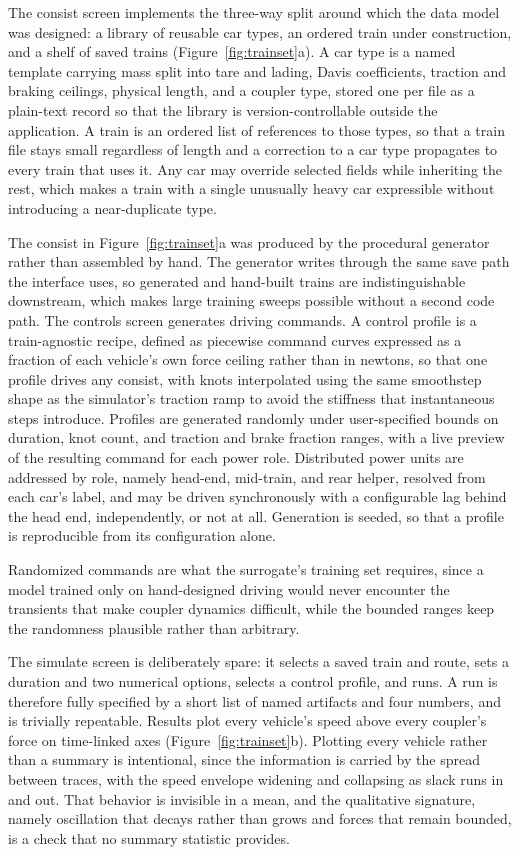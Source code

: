 \documentclass[numbered]{trbunofficial}
\begin{document}
The consist screen implements the three-way split around which the data model was designed: a library of reusable car types, an ordered train under construction, and a shelf of saved trains (Figure~\ref{fig:trainset}a). A car type is a named template carrying mass split into tare and lading, Davis coefficients, traction and braking ceilings, physical length, and a coupler type, stored one per file as a plain-text record so that the library is version-controllable outside the application. A train is an ordered list of references to those types, so that a train file stays small regardless of length and a correction to a car type propagates to every train that uses it. Any car may override selected fields while inheriting the rest, which makes a train with a single unusually heavy car expressible without introducing a near-duplicate type.

The consist in Figure~\ref{fig:trainset}a was produced by the procedural generator rather than assembled by hand. The generator writes through the same save path the interface uses, so generated and hand-built trains are indistinguishable downstream, which makes large training sweeps possible without a second code path. The controls screen generates driving commands. A control profile is a train-agnostic recipe, defined as piecewise command curves expressed as a fraction of each vehicle's own force ceiling rather than in newtons, so that one profile drives any consist, with knots interpolated using the same smoothstep shape as the simulator's traction ramp to avoid the stiffness that instantaneous steps introduce. Profiles are generated randomly under user-specified bounds on duration, knot count, and traction and brake fraction ranges, with a live preview of the resulting command for each power role. Distributed power units are addressed by role, namely head-end, mid-train, and rear helper, resolved from each car's label, and may be driven synchronously with a configurable lag behind the head end, independently, or not at all. Generation is seeded, so that a profile is reproducible from its configuration alone.

Randomized commands are what the surrogate's training set requires, since a model trained only on hand-designed driving would never encounter the transients that make coupler dynamics difficult, while the bounded ranges keep the randomness plausible rather than arbitrary.

The simulate screen is deliberately spare: it selects a saved train and route, sets a duration and two numerical options, selects a control profile, and runs. A run is therefore fully specified by a short list of named artifacts and four numbers, and is trivially repeatable. Results plot every vehicle's speed above every coupler's force on time-linked axes (Figure~\ref{fig:trainset}b). Plotting every vehicle rather than a summary is intentional, since the information is carried by the spread between traces, with the speed envelope widening and collapsing as slack runs in and out. That behavior is invisible in a mean, and the qualitative signature, namely oscillation that decays rather than grows and forces that remain bounded, is a check that no summary statistic provides.
\end{document}
